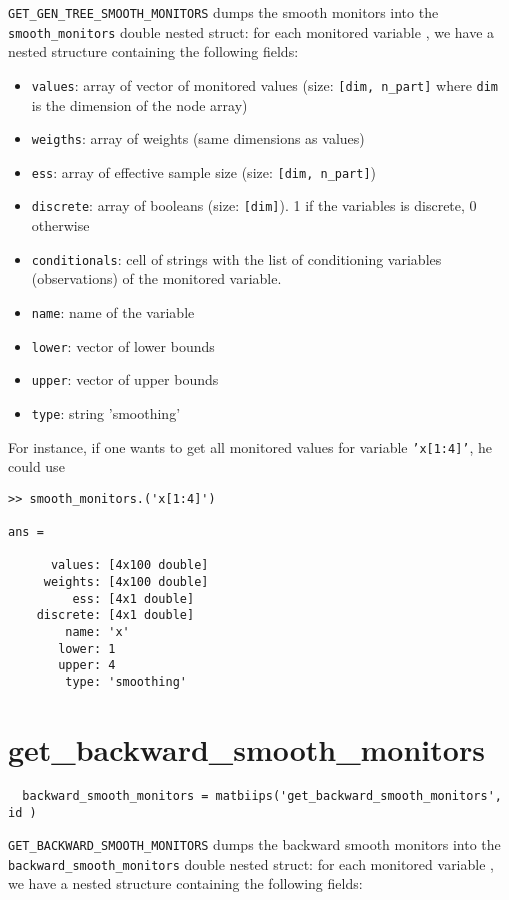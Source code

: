 \documentclass[11pt,twoside]{article}
\begin{document}
 \texttt{GET\_GEN\_TREE\_SMOOTH\_MONITORS} dumps the smooth monitors into the \texttt{smooth\_monitors} double nested struct: for each monitored variable , we have
  a nested structure containing the following fields:

  \begin{itemize}
   \item \texttt{values}: array of vector of monitored values (size: \texttt{[dim, n\_part]} where \texttt{dim} is the dimension of the node array)
   \item \texttt{weigths}: array of weights (same dimensions as values)
   \item \texttt{ess}: array of effective  sample size (size: \texttt{[dim, n\_part]})
   \item \texttt{discrete}: array of booleans (size: \texttt{[dim]}). 1 if the variables is discrete, 0 otherwise
   \item \texttt{conditionals}: cell of strings with the list of conditioning variables (observations) of the monitored variable.
   \item \texttt{name}: name of the variable
   \item \texttt{lower}: vector of lower bounds
   \item \texttt{upper}: vector of upper bounds
   \item \texttt{type}: string 'smoothing'
   \end{itemize}

  For instance, if one wants to get all monitored values for variable \texttt{'x[1:4]'}, he could use
 \begin{lstlisting}
>> smooth_monitors.('x[1:4]')

ans =

      values: [4x100 double]
     weights: [4x100 double]
         ess: [4x1 double]
    discrete: [4x1 double]
        name: 'x'
       lower: 1
       upper: 4
        type: 'smoothing'
 \end{lstlisting}

 \section{get\_backward\_smooth\_monitors}

 \begin{lstlisting}
  backward_smooth_monitors = matbiips('get_backward_smooth_monitors', id )
 \end{lstlisting}

 \texttt{GET\_BACKWARD\_SMOOTH\_MONITORS} dumps the backward smooth monitors into the \texttt{backward\_smooth\_monitors} double nested struct: for each monitored variable , we have
  a nested structure containing the following fields:
\end{document}
